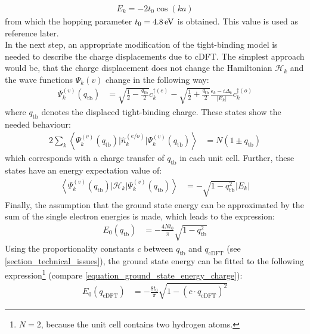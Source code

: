 \begin{align}
	E_k = -2t_0\cos(ka)
\end{align}
from which the hopping parameter $t_0 = \unit[4.8]{eV}$ is obtained. This value is used as reference later.\\
In the next step, an appropriate modification of the tight-binding model is needed to describe the charge displacements due to cDFT. The simplest approach would be, that the charge displacement does not change the Hamiltonian $\mathcal{H}_k$ and the wave functions $\Psi_k{(v)}$ change in the following way:
\begin{align}
\Psi_k^{(v)}(q_\text{tb}) &= \sqrt{\frac{1}{2}-\frac{q_\text{tb}}{2}}c_k^{\dagger(e)}- \sqrt{\frac{1}{2}+\frac{q_\text{tb}}{2}}\frac{\epsilon_k - i \Delta_k}{|E_k|}c_{k}^{\dagger(o)}
\end{align}
where $q_\text{tb}$ denotes the displaced tight-binding charge. These states show the needed behaviour:
\begin{align}
	2\sum_k\left\langle\Psi_k^{(v)}(q_\text{tb})\Big|\hat{n}_k^{(e/o)}\Big|\Psi_k^{(v)}(q_\text{tb})\right\rangle &= N \left(1 \pm q_\text{tb}\right)
\end{align}
which corresponds with a charge transfer of $q_\text{tb}$ in each unit cell. Further, these states have an energy expectation value of:
\begin{align}
\left\langle\Psi_k^{(v)}(q_\text{tb})\Big|\mathcal{H}_{k}\Big|\Psi_k^{(v)}(q_\text{tb})\right\rangle &= -\sqrt{1-q^2_\text{tb}} |E_k|
\label{equation_method_1_energies}
\end{align}
Finally, the assumption that the ground state energy can be approximated by the sum of the single electron energies is made, which leads to the expression:
\begin{align}
E_0(q_\text{tb}) &= -\frac{4Nt_0}{\pi} \sqrt{1-q^2_\text{tb}}
\label{equation_ground_state_energy_charge}
\end{align}
Using the proportionality constants $c$ between $q_\text{tb}$ and $q_\text{cDFT}$ (see \cref{section_technical_issues}), the ground state energy can be fitted to the following expression\footnote{$N=2$, because the unit cell contains two hydrogen atoms.} (compare \cref{equation_ground_state_energy_charge}):
\begin{align}
	E_0(q_\text{cDFT}) &= -\frac{8t_0}{\pi} \sqrt{1 - \left(c\cdot q_\text{cDFT}\right)^2}
\end{align}
